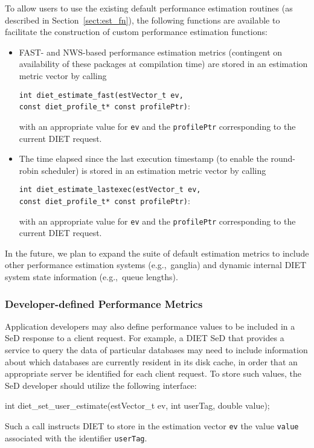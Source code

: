 To allow users to use the existing default performance estimation
routines (as described in Section~\ref{sect:est_fn}), the following
functions are available to facilitate the construction of custom
performance estimation functions:
\begin{itemize}
\item FAST- and NWS-based performance estimation metrics (contingent
  on availability of these packages at compilation time) are stored in
  an estimation metric vector by calling
  \begin{tabbing}
    \texttt{int diet\_estimate\_fast(}\=\texttt{estVector\_t ev,} \\
    \> \texttt{const diet\_profile\_t* const profilePtr)}:
  \end{tabbing}
   with an appropriate value for \texttt{ev} and the
   \texttt{profilePtr} corresponding to the current DIET request.
\item The time elapsed since the last execution timestamp (to enable
  the round-robin scheduler) is stored in an estimation metric vector
  by calling
  \begin{tabbing}
    \texttt{int diet\_estimate\_lastexec(}\=\texttt{estVector\_t ev,} \\
    \> \texttt{const diet\_profile\_t* const profilePtr)}:
  \end{tabbing}
  with an appropriate value for \texttt{ev} and the
  \texttt{profilePtr} corresponding to the current DIET request.

\end{itemize}

In the future, we plan to expand the suite of default estimation
metrics to include other performance estimation systems
(e.g.,~ganglia) and dynamic internal DIET system state information
(e.g.,~queue lengths).

\subsubsection{Developer-defined Performance Metrics}

Application developers may also define performance values to be
included in a SeD response to a client request.  For example, a DIET
SeD that provides a service to query the data of particular databases may need
to include information about which databases are currently resident in
its disk cache, in order that an appropriate server be identified for
each client request.  To store such values, the SeD developer should
utilize the following interface:
\begin{code}
int diet\_set\_user\_estimate(estVector\_t ev, int userTag, double value);
\end{code}
Such a call instructs DIET to store in the estimation vector
\texttt{ev} the value \texttt{value} associated with the identifier
\texttt{userTag}.


